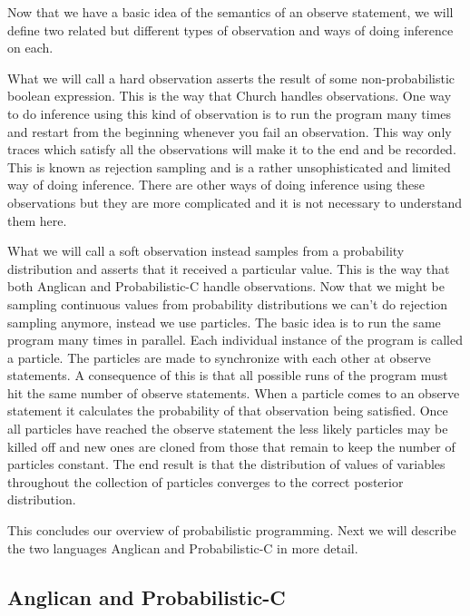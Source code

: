 \documentclass[a4paper]{article}
\begin{document}
Now that we have a basic idea of the semantics of an observe statement, we will define two related but different types of observation and ways of doing inference on each.

What we will call a hard observation asserts the result of some non-probabilistic boolean expression. This is the way that Church handles observations. One way to do inference using this kind of observation is to run the program many times and restart from the beginning whenever you fail an observation. This way only traces which satisfy all the observations will make it to the end and be recorded. This is known as rejection sampling and is a rather unsophisticated and limited way of doing inference. There are other ways of doing inference using these observations but they are more complicated and it is not necessary to understand them here.

What we will call a soft observation instead samples from a probability distribution and asserts that it received a particular value. This is the way that both Anglican and Probabilistic-C handle observations. Now that we might be sampling continuous values from probability distributions we can't do rejection sampling anymore, instead we use particles. The basic idea is to run the same program many times in parallel. Each individual instance of the program is called a particle. The particles are made to synchronize with each other at observe statements. A consequence of this is that all possible runs of the program must hit the same number of observe statements. When a particle comes to an observe statement it calculates the probability of that observation being satisfied. Once all particles have reached the observe statement the less likely particles may be killed off and new ones are cloned from those that remain to keep the number of particles constant. The end result is that the distribution of values of variables throughout the collection of particles converges to the correct posterior distribution.

This concludes our overview of probabilistic programming. Next we will describe the two languages Anglican and Probabilistic-C in more detail.




\subsection{Anglican and Probabilistic-C}
\end{document}
